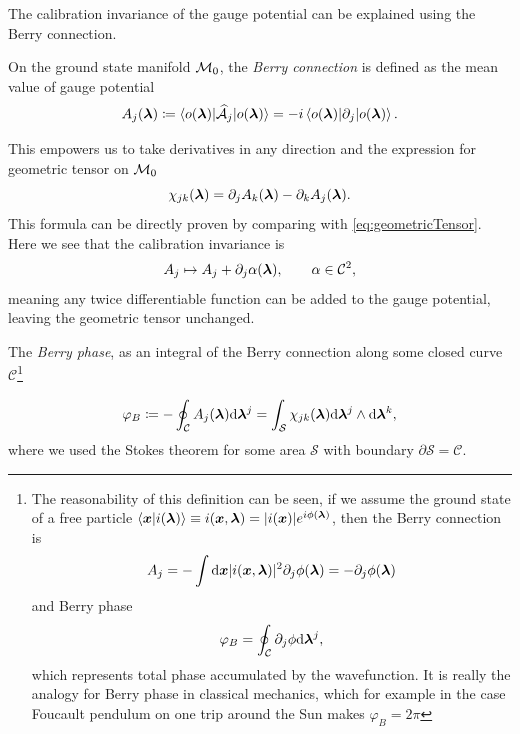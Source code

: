 The calibration invariance of the gauge potential can be explained using the Berry connection.
\begin{definition}    
    On the ground state manifold $\mathcal{M}_0$, the \emph{Berry connection} is defined as the mean value of gauge potential
    \begin{equation}
        A_j({\bm\lambda})\coloneqq \braket{o({\bm\lambda})|\mathcal{\widehat{A}}_j|o({\bm\lambda})}= -i \braket{o({\bm\lambda})|\partial_j|o({\bm\lambda})}.
        \label{eq:berryConnection}
    \end{equation}
\end{definition}
    

This empowers us to take derivatives in any direction and the expression for geometric tensor on $\mathcal{M}_0$
\begin{equation}
    \chi_{jk}({\bm\lambda}) = \partial_j A_k({\bm\lambda})-\partial_k A_j({\bm\lambda})
    \label{eq:geometricTensorRedef}.
\end{equation}
This formula can be directly proven by comparing with \ref{eq:geometricTensor}. Here we see that the calibration invariance is 
\begin{equation}
    A_j \mapsto A_j+\partial_j \alpha({\bm\lambda}),\qquad \alpha\in\mathcal C^2,
\end{equation}
meaning any twice differentiable function can be added to the gauge potential, leaving the geometric tensor unchanged.

\begin{definition}
    
    The \emph{Berry phase}, as an integral of the Berry connection along some closed curve $\mathcal{C}$\footnote{
        The reasonability of this definition can be seen, if we assume the ground state of a free particle
        $\braket{\bm{x}|i({\bm\lambda})}\equiv i(\bm{x},{\bm\lambda})= |i(\bm{x})|e^{i\phi({\bm\lambda})}$,
        then the Berry connection is
        \begin{equation}
            A_j=-\int \mathrm{d} \bm{x}|i(\bm{x},{\bm\lambda})|^2\partial_j \phi({\bm\lambda}) = -\partial_j \phi({\bm\lambda})
        \end{equation} 
        and Berry phase
        \begin{equation}
            \varphi_B=\oint_\mathcal{C} \partial_j \phi \mathrm{d} {\bm\lambda}^j,
        \end{equation}
        which represents total phase accumulated by the wavefunction. It is really the analogy for Berry phase in classical mechanics, which for example in the case Foucault pendulum on one trip around the Sun makes $\varphi_B=2\pi$
        }

    \begin{equation}
        \varphi_B\coloneqq-\oint_\mathcal{C} A_j({\bm\lambda})\mathrm{d} {\bm\lambda}^j=\int_\mathcal{S} \chi_{jk}({\bm\lambda})\mathrm{d} {\bm\lambda}^j \wedge \mathrm{d}{\bm\lambda}^k,
    \end{equation}
    where we used the Stokes theorem for some area $\mathcal{S}$ with boundary $\partial\mathcal{S}=\mathcal{C}$.    
    
\end{definition}

